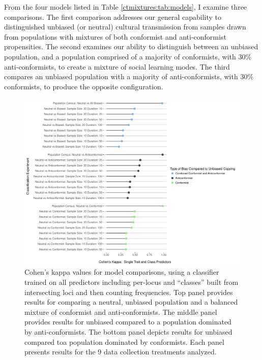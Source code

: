 From the four models listed in Table \ref{ctmixtures:tab:models}, I examine three comparisons.  The first comparison addresses our general capability to distinguished unbiased (or neutral) cultural transmission from samples drawn from populations with mixtures of both conformist and anti-conformist propensities.  The second examines our ability to distinguish between an unbiased population, and a population comprised of a majority of conformists, with 30\% anti-conformists, to create a mixture of social learning modes.  The third compares an unbiased population with a majority of anti-conformists, with 30\% conformists, to produce the opposite configuration.

\begin{figure}[p!]
\centering\includegraphics[scale=0.65]{graphics/ctmixtures/eq5-kappa-dotchart-full-predictors.pdf}
\caption{Cohen's kappa values for model comparisons, using a classifier trained on all predictors including per-locus and ``classes'' built from intersecting loci and then counting frequencies.  Top panel provides results for comparing a neutral, unbiased population and a balanced mixture of conformist and anti-conformists.  The middle panel provides results for unbiased compared to a population dominated by anti-conformists.  The bottom panel depicts results for unbiased compared toa population dominated by conformists.  Each panel presents results for the 9 data collection treatments analyzed.}
\label{ctmixtures:fig:kappa-full-predictors}
\end{figure}

